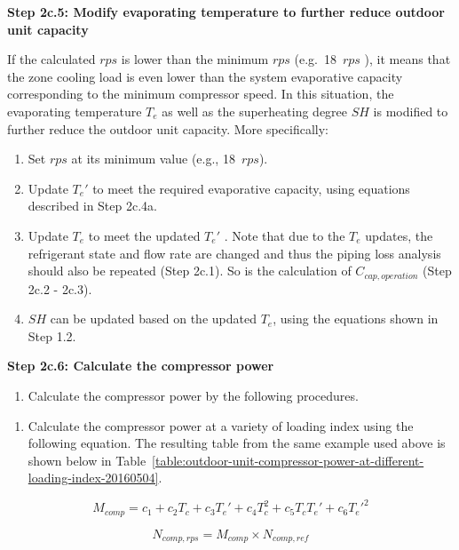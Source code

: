 \textbf{Step 2c.5: Modify evaporating temperature to further reduce outdoor unit capacity}

If the calculated \(rps\) is lower than the minimum \(rps\) (e.g.~18~\(rps\) ), it means that the zone cooling load is even lower than the system evaporative capacity corresponding to the minimum compressor speed. In this situation, the evaporating temperature \(T_e\) as well as the superheating degree \(SH\) is modified to further reduce the outdoor unit capacity. More specifically:

\begin{enumerate}
\def\labelenumi{\alph{enumi}.}
\item
  Set \(rps\) at its minimum value (e.g., 18~\(rps\)).
\item
  Update \({T_e}'\) to meet the required evaporative capacity, using equations described in Step 2c.4a.
\item
  Update \(T_e\) to meet the updated \({T_e}'\) . Note that due to the \(T_e\) updates, the refrigerant state and flow rate are changed and thus the piping loss analysis should also be repeated (Step 2c.1). So is the calculation of \(C_{cap,operation}\) (Step 2c.2 - 2c.3).
\item
  \(SH\) can be updated based on the updated \(T_e\), using the equations shown in Step 1.2.
\end{enumerate}

\textbf{Step 2c.6: Calculate the compressor power}

\begin{enumerate}
\def\labelenumi{(\arabic{enumi})}
\tightlist
\item
  Calculate the compressor power by the following procedures.
\end{enumerate}

\begin{enumerate}
\def\labelenumi{\alph{enumi}.}
\tightlist
\item
  Calculate the compressor power at a variety of loading index using the following equation. The resulting table from the same example used above is shown below in Table~\ref{table:outdoor-unit-compressor-power-at-different-loading-index-20160504}.
\end{enumerate}

\begin{equation}
  M_{comp} = c_1+c_2T_c+c_3{T_e}'+c_4T_c^2+c_5T_c{T_e}'+c_6{T_e}'^2
\end{equation}

\begin{equation}
  N_{comp,rps} = M_{comp} \times N_{comp,ref}
\end{equation}

